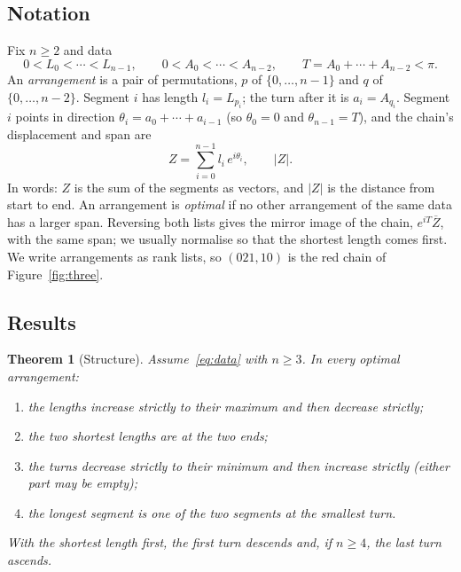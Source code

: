 \documentclass[11pt]{article}
\newtheorem{theorem}{Theorem}
\theoremstyle{remark}
\begin{document}
\subsection*{Notation}

Fix $n\ge2$ and data
\begin{equation}\label{eq:data}
0<L_0<\cdots<L_{n-1},\qquad 0<A_0<\cdots<A_{n-2},\qquad T=A_0+\cdots+A_{n-2}<\pi .
\end{equation}
An \emph{arrangement} is a pair of permutations, $p$ of $\{0,\dots,n-1\}$ and $q$ of $\{0,\dots,n-2\}$. Segment $i$ has length $l_i=L_{p_i}$; the turn after it is $a_i=A_{q_i}$. Segment $i$ points in direction $\theta_i=a_0+\cdots+a_{i-1}$ (so $\theta_0=0$ and $\theta_{n-1}=T$), and the chain's displacement and span are
\begin{equation}\label{eq:span}
Z=\sum_{i=0}^{n-1} l_i\,e^{i\theta_i},\qquad |Z|.
\end{equation}
In words: $Z$ is the sum of the segments as vectors, and $|Z|$ is the distance from start to end. An arrangement is \emph{optimal} if no other arrangement of the same data has a larger span. Reversing both lists gives the mirror image of the chain, $e^{iT}\overline{Z}$, with the same span; we usually normalise so that the shortest length comes first. We write arrangements as rank lists, so $(021,10)$ is the red chain of Figure~\ref{fig:three}.

\subsection*{Results}

\begin{theorem}[Structure]\label{thm:structure}
Assume~\eqref{eq:data} with $n\ge3$. In every optimal arrangement:
\begin{enumerate}
\item the lengths increase strictly to their maximum and then decrease strictly;
\item the two shortest lengths are at the two ends;
\item the turns decrease strictly to their minimum and then increase strictly (either part may be empty);
\item the longest segment is one of the two segments at the smallest turn.
\end{enumerate}
With the shortest length first, the first turn descends and, if $n\ge4$, the last turn ascends.
\end{theorem}
\end{document}
